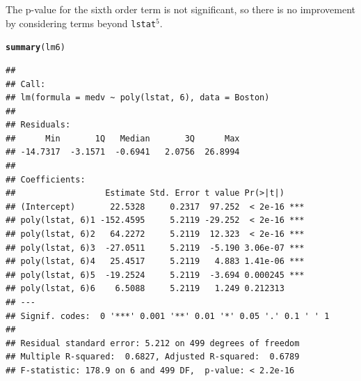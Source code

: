 \documentclass[11pt]{article}\usepackage[]{graphicx}\usepackage[]{color}
\makeatletter
\newcommand{\hlstd}[1]{\textcolor[rgb]{0.345,0.345,0.345}{#1}}%
\newcommand{\hlkwd}[1]{\textcolor[rgb]{0.737,0.353,0.396}{\textbf{#1}}}%
\newenvironment{kframe}{%
 \def\at@end@of@kframe{}%
 \ifinner\ifhmode%
  \def\at@end@of@kframe{\end{minipage}}%
  \begin{minipage}{\columnwidth}%
 \fi\fi%
 \def\FrameCommand##1{\hskip\@totalleftmargin \hskip-\fboxsep
 \colorbox{shadecolor}{##1}\hskip-\fboxsep
     \hskip-\linewidth \hskip-\@totalleftmargin \hskip\columnwidth}%
 \MakeFramed {\advance\hsize-\width
   \@totalleftmargin\z@ \linewidth\hsize
   \@setminipage}}%
 {\par\unskip\endMakeFramed%
 \at@end@of@kframe}
\newenvironment{knitrout}{}{} %
\makeatother
\begin{document}
The p-value for the sixth order term is not significant, so there is no improvement by considering terms beyond \texttt{lstat}$^5$.
\begin{knitrout}
\color{fgcolor}\begin{kframe}
\begin{alltt}
\hlkwd{summary}\hlstd{(lm6)}
\end{alltt}
\begin{verbatim}
## 
## Call:
## lm(formula = medv ~ poly(lstat, 6), data = Boston)
## 
## Residuals:
##      Min       1Q   Median       3Q      Max 
## -14.7317  -3.1571  -0.6941   2.0756  26.8994 
## 
## Coefficients:
##                  Estimate Std. Error t value Pr(>|t|)    
## (Intercept)       22.5328     0.2317  97.252  < 2e-16 ***
## poly(lstat, 6)1 -152.4595     5.2119 -29.252  < 2e-16 ***
## poly(lstat, 6)2   64.2272     5.2119  12.323  < 2e-16 ***
## poly(lstat, 6)3  -27.0511     5.2119  -5.190 3.06e-07 ***
## poly(lstat, 6)4   25.4517     5.2119   4.883 1.41e-06 ***
## poly(lstat, 6)5  -19.2524     5.2119  -3.694 0.000245 ***
## poly(lstat, 6)6    6.5088     5.2119   1.249 0.212313    
## ---
## Signif. codes:  0 '***' 0.001 '**' 0.01 '*' 0.05 '.' 0.1 ' ' 1
## 
## Residual standard error: 5.212 on 499 degrees of freedom
## Multiple R-squared:  0.6827,	Adjusted R-squared:  0.6789 
## F-statistic: 178.9 on 6 and 499 DF,  p-value: < 2.2e-16
\end{verbatim}
\end{kframe}
\end{knitrout}
\end{document}
